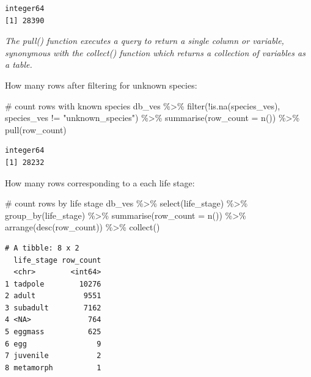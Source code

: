 \documentclass[
  letterpaper,
  DIV=11,
  numbers=noendperiod]{scrartcl}
\newenvironment{Shaded}{\begin{snugshade}}{\end{snugshade}}
\newcommand{\AttributeTok}[1]{\textcolor[rgb]{0.40,0.45,0.13}{#1}}
\newcommand{\CommentTok}[1]{\textcolor[rgb]{0.37,0.37,0.37}{#1}}
\newcommand{\FunctionTok}[1]{\textcolor[rgb]{0.28,0.35,0.67}{#1}}
\newcommand{\NormalTok}[1]{\textcolor[rgb]{0.00,0.23,0.31}{#1}}
\newcommand{\SpecialCharTok}[1]{\textcolor[rgb]{0.37,0.37,0.37}{#1}}
\newcommand{\StringTok}[1]{\textcolor[rgb]{0.13,0.47,0.30}{#1}}
\begin{document}
\begin{verbatim}
integer64
[1] 28390
\end{verbatim}

\emph{The pull() function executes a query to return a single column or
variable, synonymous with the collect() function which returns a
collection of variables as a table.}

How many rows after filtering for unknown species:

\begin{Shaded}
\begin{Highlighting}[]
\CommentTok{\# count rows with known species}
\NormalTok{db\_ves }\SpecialCharTok{\%\textgreater{}\%}
  \FunctionTok{filter}\NormalTok{(}\SpecialCharTok{!}\FunctionTok{is.na}\NormalTok{(species\_ves),}
\NormalTok{         species\_ves }\SpecialCharTok{!=} \StringTok{"unknown\_species"}\NormalTok{) }\SpecialCharTok{\%\textgreater{}\%}
  \FunctionTok{summarise}\NormalTok{(}\AttributeTok{row\_count =} \FunctionTok{n}\NormalTok{()) }\SpecialCharTok{\%\textgreater{}\%}
  \FunctionTok{pull}\NormalTok{(row\_count)}
\end{Highlighting}
\end{Shaded}

\begin{verbatim}
integer64
[1] 28232
\end{verbatim}

How many rows corresponding to a each life stage:

\begin{Shaded}
\begin{Highlighting}[]
\CommentTok{\# count rows by life stage}
\NormalTok{db\_ves }\SpecialCharTok{\%\textgreater{}\%}
  \FunctionTok{select}\NormalTok{(life\_stage) }\SpecialCharTok{\%\textgreater{}\%}
  \FunctionTok{group\_by}\NormalTok{(life\_stage) }\SpecialCharTok{\%\textgreater{}\%}
  \FunctionTok{summarise}\NormalTok{(}\AttributeTok{row\_count =} \FunctionTok{n}\NormalTok{()) }\SpecialCharTok{\%\textgreater{}\%}
  \FunctionTok{arrange}\NormalTok{(}\FunctionTok{desc}\NormalTok{(row\_count)) }\SpecialCharTok{\%\textgreater{}\%}
  \FunctionTok{collect}\NormalTok{()}
\end{Highlighting}
\end{Shaded}

\begin{verbatim}
# A tibble: 8 x 2
  life_stage row_count
  <chr>        <int64>
1 tadpole        10276
2 adult           9551
3 subadult        7162
4 <NA>             764
5 eggmass          625
6 egg                9
7 juvenile           2
8 metamorph          1
\end{verbatim}
\end{document}

